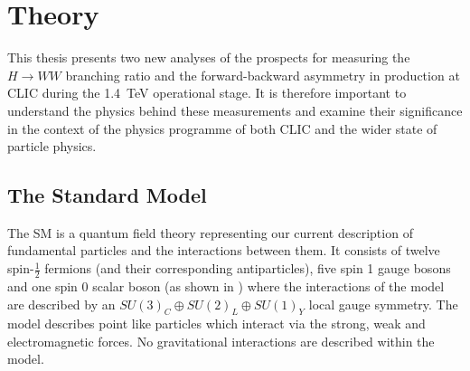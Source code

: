 \chapter{Theory}
\label{theory}

This thesis presents two new analyses of the prospects for measuring the $H\rightarrow WW$ branching ratio and the forward-backward asymmetry in \ttbar production at CLIC during the 1.4~TeV operational stage. It is therefore important to understand the physics behind these measurements and examine their significance in the context of the physics programme of both CLIC and the wider state of particle physics.


\section{The Standard Model}

The \ac{SM} is a quantum field theory representing our current description of fundamental particles and the interactions between them. It consists of twelve spin-$\frac{1}{2}$ fermions (and their corresponding antiparticles), five spin 1 gauge bosons and one spin 0 scalar boson (as shown in ) where the interactions of the model are described by an $SU(3)_{C}\oplus SU(2)_{L}\oplus SU(1)_{Y}$ local gauge symmetry. The model describes point like particles which interact via the strong, weak and electromagnetic forces. No gravitational interactions are described within the model.

